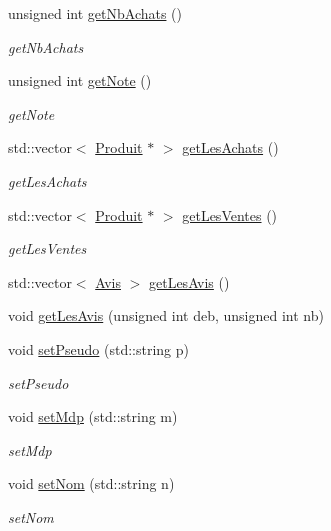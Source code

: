 \begin{DoxyCompactItemize}
unsigned int \hyperlink{class_utilisateur_a5fd1e4951abad29ba9ae1ac8760c726d}{get\-Nb\-Achats} ()
\begin{DoxyCompactList}\small\item\em get\-Nb\-Achats \end{DoxyCompactList}\item 
unsigned int \hyperlink{class_utilisateur_a2727eb739e0065c9aac277b5d2703b7e}{get\-Note} ()
\begin{DoxyCompactList}\small\item\em get\-Note \end{DoxyCompactList}\item 
std\-::vector$<$ \hyperlink{class_produit}{Produit} $\ast$ $>$ \hyperlink{class_utilisateur_a98c52de15b6cb4cd90ab9843887ebea4}{get\-Les\-Achats} ()
\begin{DoxyCompactList}\small\item\em get\-Les\-Achats \end{DoxyCompactList}\item 
std\-::vector$<$ \hyperlink{class_produit}{Produit} $\ast$ $>$ \hyperlink{class_utilisateur_a1b40d3e45c297b261321c3846fb0c214}{get\-Les\-Ventes} ()
\begin{DoxyCompactList}\small\item\em get\-Les\-Ventes \end{DoxyCompactList}\item 
std\-::vector$<$ \hyperlink{class_avis}{Avis} $>$ \hyperlink{class_utilisateur_a8e5721905dee5dea491c7a0c8811aaa0}{get\-Les\-Avis} ()
\item 
void \hyperlink{class_utilisateur_af62b73aa8bca25a0aa3466339d6a97d3}{get\-Les\-Avis} (unsigned int deb, unsigned int nb)
\item 
void \hyperlink{class_utilisateur_a8463c077b33ccc93c8e424a47b9bc369}{set\-Pseudo} (std\-::string p)
\begin{DoxyCompactList}\small\item\em set\-Pseudo \end{DoxyCompactList}\item 
void \hyperlink{class_utilisateur_a34f6a4cd57807390db2bfc3f880eec58}{set\-Mdp} (std\-::string m)
\begin{DoxyCompactList}\small\item\em set\-Mdp \end{DoxyCompactList}\item 
void \hyperlink{class_utilisateur_a20a32b47f2b080a4aead49e16bd06f44}{set\-Nom} (std\-::string n)
\begin{DoxyCompactList}\small\item\em set\-Nom \end{DoxyCompactList}\item 

\end{DoxyCompactItemize}
